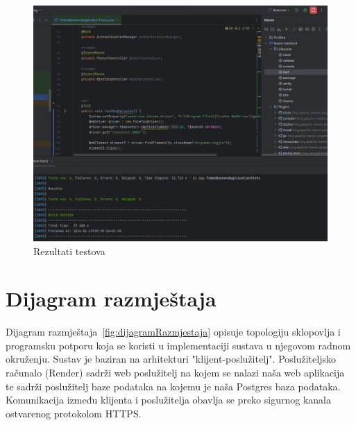 			\begin{figure}[H]
				\includegraphics[width=\textwidth]{slike/SeleniumAll.png} %
				\caption{Rezultati testova}
				\label{fig:SeleniumAll} %
			\end{figure}
			
			\eject 
		
		
		\section{Dijagram razmještaja}
			
			Dijagram razmještaja~\ref{fig:dijagramRazmjestaja} opisuje topologiju sklopovlja i programsku potporu koja se koristi u implementaciji sustava u njegovom radnom okruženju. Sustav je baziran na arhitekturi "klijent-poslužitelj". Poslužiteljsko računalo (Render) sadrži web poslužitelj na kojem se nalazi naša web aplikacija te sadrži poslužitelj baze podataka na kojemu je naša Postgres baza podataka. Komunikacija između klijenta i poslužitelja obavlja se preko sigurnog kanala ostvarenog protokolom HTTPS.
			
